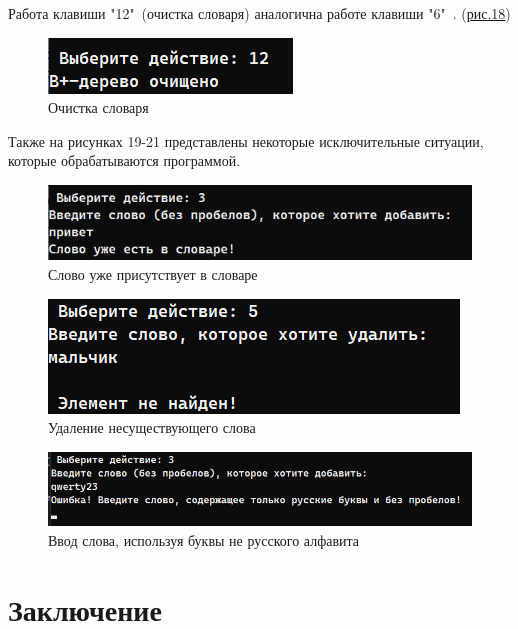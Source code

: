 \documentclass[11pt,a4paper,final]{article} %
\begin{document}
Работа клавиши "12"\ (очистка словаря) аналогична работе клавиши "6"\ . (\hyperref[fig:pic15]{рис.18})
\begin{figure}[H]
	\centering
	\includegraphics[width=0.4\linewidth]{img/pic15.png}
	\caption{Очистка словаря}
	\label{fig:pic15}
\end{figure}


\newpage
Также на рисунках 19-21 представлены некоторые исключительные ситуации, которые обрабатываются программой.
\begin{figure}[H]
	\centering
	\includegraphics[width=0.5\linewidth]{img/pic16.png}
	\caption{Слово уже присутствует в словаре}
	\label{fig:pic16}
\end{figure}

\begin{figure}[H]
	\centering
	\includegraphics[width=0.5\linewidth]{img/pic17.png}
	\caption{Удаление несуществующего слова}
	\label{fig:pic17}
\end{figure}

\begin{figure}[H]
	\centering
	\includegraphics[width=0.6\linewidth]{img/pic18.png}
	\caption{Ввод слова, используя буквы не русского алфавита}
	\label{fig:pic18}
\end{figure}



\newpage
\section*{\hspace{1.15cm}Заключение}
\end{document}
